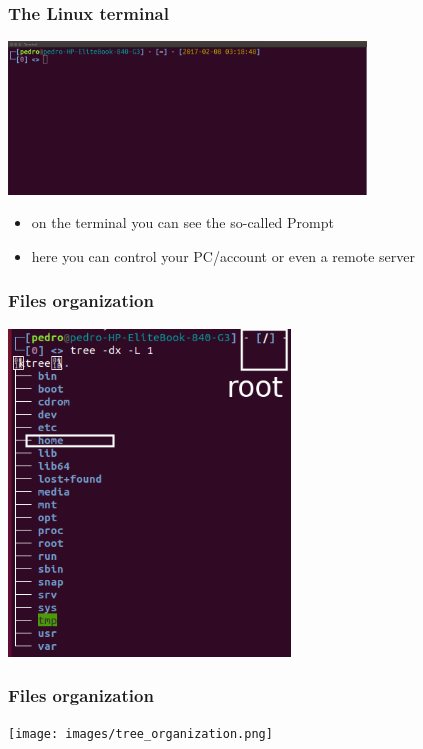 \begin{frame}
	\frametitle{The Linux terminal}
        \begin{center}
        \includegraphics[width=9.5cm]{images/terminal_linux.png}
        \end{center}
	\begin{itemize}
		\item	on the terminal you can see the so-called Prompt
		\item	here you can control your PC/account or even
                 a remote server
	\end{itemize}
	
\end{frame}

\begin{frame}
	\frametitle{Files organization}
        \begin{center}
        \includegraphics[width=7.5cm]{images/tree_root.png}
        \end{center}
\end{frame}
\begin{frame}
	\frametitle{Files organization}
        \begin{center}
        \texttt{[image: images/tree\_organization.png]}
        \end{center}
\end{frame}


